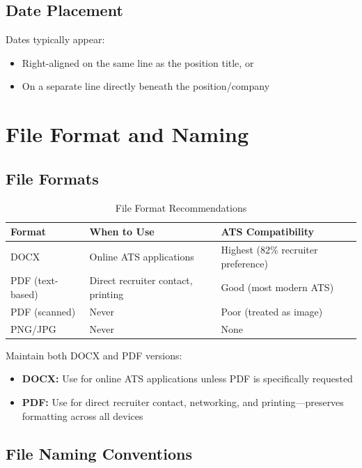 \documentclass[11pt,a4paper]{article}
\begin{document}
\subsection{Date Placement}

Dates typically appear:
\begin{itemize}
    \item Right-aligned on the same line as the position title, or
    \item On a separate line directly beneath the position/company
\end{itemize}

\section{File Format and Naming}

\subsection{File Formats}

\begin{table}[h]
\centering
\begin{tabular}{@{}lll@{}}
\toprule
\textbf{Format} & \textbf{When to Use} & \textbf{ATS Compatibility} \\
\midrule
DOCX & Online ATS applications & Highest (82\% recruiter preference) \\
PDF (text-based) & Direct recruiter contact, printing & Good (most modern ATS) \\
PDF (scanned) & Never & Poor (treated as image) \\
PNG/JPG & Never & None \\
\bottomrule
\end{tabular}
\caption{File Format Recommendations}
\end{table}

\begin{bestpractice}
Maintain both DOCX and PDF versions:
\begin{itemize}[noitemsep]
    \item \textbf{DOCX:} Use for online ATS applications unless PDF is specifically requested
    \item \textbf{PDF:} Use for direct recruiter contact, networking, and printing---preserves formatting across all devices
\end{itemize}
\end{bestpractice}

\subsection{File Naming Conventions}
\end{document}
